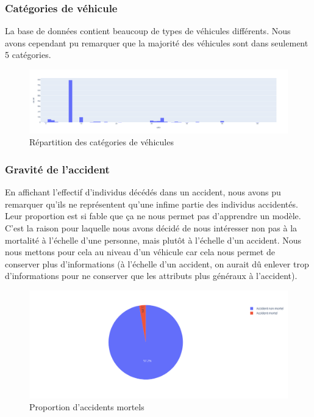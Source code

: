 \documentclass{article}
\begin{document}
    \subsubsection{Catégories de véhicule}
    La base de données contient beaucoup de types de véhicules différents. Nous avons cependant pu remarquer 
    que la majorité des véhicules sont dans seulement 5 catégories.
    \begin{figure}[ht]
        \centering
        \includegraphics[width=12cm]{./img/catv1.png}
        \caption{Répartition des catégories de véhicules}
    \end{figure}

    \subsubsection{Gravité de l'accident}
    En affichant l'effectif d'individus décédés dans un accident, nous avons pu remarquer qu'ils ne représentent qu'une 
    infime partie des individus accidentés. Leur proportion est si fable que ça ne nous permet pas d'apprendre 
    un modèle. C'est la raison pour laquelle nous avons décidé de nous intéresser non pas à la mortalité 
    à l'échelle d'une personne, mais plutôt à l'échelle d'un accident. Nous nous mettons pour cela au niveau d'un 
    véhicule car cela nous permet de conserver plus d'informations (à l'échelle d'un accident, on aurait 
    dû enlever trop d'informations pour ne conserver que les attributs plus généraux à l'accident).

    \begin{figure}[ht]
        \centering
        \includegraphics[width=12cm]{./img/grav1.png}
        \caption{Proportion d'accidents mortels}
    \end{figure}
\end{document}

